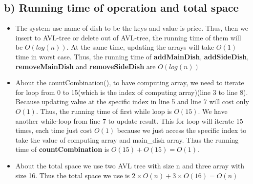 \documentclass{article}
\begin{document}
	\subsection*{b) Running time of operation and total space}
	\begin{itemize}
		\item The system use name of dish to be the keys and value is price. Thus, then we insert to AVL-tree or delete out of AVL-tree, the running time of them will be \(O(log(n))\). At the same time, updating the arrays will take \(O(1)\) time in worst case. Thus, the running time of \textbf{addMainDish}, \textbf{addSideDish}, \textbf{removeMainDish} and \textbf{removeSideDish} are \(O(log(n))\)
		\item About the countCombination(), to have computing array, we need to iterate for loop from 0 to 15(which is the index of computing array)(line 3 to line 8). Because updating value at the specific index in line 5 and line 7 will cost only \(O(1)\). Thus, the running time of first while loop is \(O(15)\). We have another while-loop from line 7 to update result. This for loop will iterate 15 times, each time just cost \(O(1)\) because we just access the specific index to take the value of computing array and main\_dish array. Thus the running time of \textbf{countCombination} is \(O(15) + O(15) = O(1)\).
		\item About the total space we use two AVL tree with size n and three array with size 16. Thus the total space we use is \(2 \times O(n) + 3 \times O(16) = O(n)\)
	\end{itemize}
\end{document}
